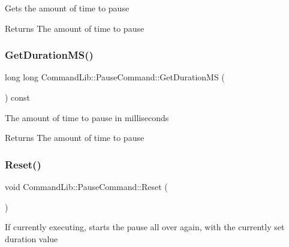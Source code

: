 Gets the amount of time to pause 

\begin{DoxyReturn}{Returns}
The amount of time to pause
\end{DoxyReturn}
\mbox{\label{class_command_lib_1_1_pause_command_a8b92e16e0d088945b64c78437d357cb1}} 
\subsubsection{\texorpdfstring{Get\+Duration\+M\+S()}{GetDurationMS()}}
{\footnotesize\ttfamily long long Command\+Lib\+::\+Pause\+Command\+::\+Get\+Duration\+MS (\begin{DoxyParamCaption}{ }\end{DoxyParamCaption}) const}



The amount of time to pause in milliseconds 

\begin{DoxyReturn}{Returns}
The amount of time to pause
\end{DoxyReturn}
\mbox{\label{class_command_lib_1_1_pause_command_abb0980872e2376aece3e184a2decd861}} 
\subsubsection{\texorpdfstring{Reset()}{Reset()}}
{\footnotesize\ttfamily void Command\+Lib\+::\+Pause\+Command\+::\+Reset (\begin{DoxyParamCaption}{ }\end{DoxyParamCaption})}



If currently executing, starts the pause all over again, with the currently set duration value 

\mbox{\label{class_command_lib_1_1_pause_command_a1ee11b6870b84a56521caa0b8e43c560}} 
